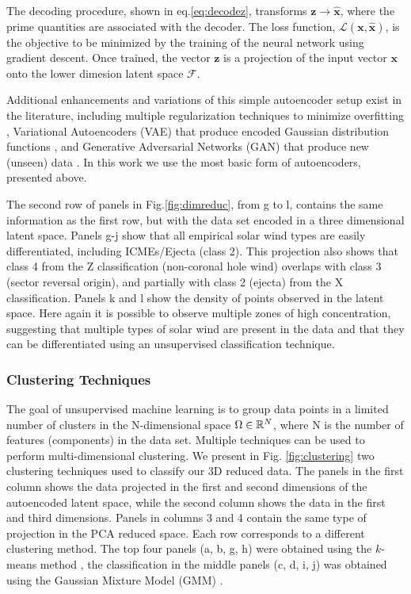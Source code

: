 The decoding procedure, shown in eq.\eqref{eq:decodez}, transforms $\boldsymbol{z}\rightarrow\boldsymbol{\hat{x}}$, where the prime quantities are associated with the decoder. The loss function, $\mathcal{L}(\boldsymbol{x}, \boldsymbol{\hat{x}})$, is the objective to be minimized by the training of the neural network using gradient descent. Once trained, the vector $\boldsymbol{z}$ is a projection of the input vector $\boldsymbol{x}$ onto the lower dimesion latent space $\boldsymbol{\mathcal{F}}$.

Additional enhancements and variations of this simple autoencoder setup exist in the literature, including multiple regularization techniques to minimize overfitting \citep{7407967}, Variational Autoencoders (VAE) that produce encoded Gaussian distribution functions \citep{Kingma2013}, and Generative Adversarial Networks (GAN) that produce new (unseen) data \citep{Goodfellow2014}. In this work we use the most basic form of autoencoders, presented above.

The second row of panels in Fig.\ref{fig:dimreduc}, from g to l, contains the same information as the first row, but with the data set encoded in a three dimensional latent space. Panels g-j show that all empirical solar wind types are easily differentiated, including ICMEs/Ejecta (class 2). This projection also shows that class 4 from the Z classification (non-coronal hole wind) overlaps with class 3 (sector reversal origin), and partially with class 2 (ejecta) from the X classification. Panels k and l show the density of points observed in the latent space. Here again it is possible to observe multiple zones of high concentration, suggesting that multiple types of solar wind are present in the data and that they can be differentiated using an unsupervised classification technique.

\subsubsection{Clustering Techniques}
\label{sec:clustering}
The goal of unsupervised machine learning is to group data points in a limited number of clusters in the N-dimensional space $\Omega\in\Bbb R^N$, where N is the number of features (components) in the data set. Multiple techniques can be used to perform multi-dimensional clustering. We present in Fig. \ref{fig:clustering} two clustering techniques used to classify our 3D reduced data. The panels in the first column shows the data projected in the first and second dimensions of the autoencoded latent space, while the second column shows the data in the first and third dimensions. Panels in columns 3 and 4 contain the same type of projection in the PCA reduced space. Each row corresponds to a different clustering method. The top four panels (a, b, g, h) were obtained using the $k$-means method \citep{1056489}, the classification in the middle panels (c, d, i, j) was obtained using the Gaussian Mixture Model (GMM) \citep{bishop2006machine}.

